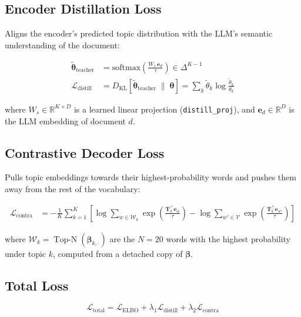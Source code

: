 \documentclass[11pt,a4paper]{article}
\begin{document}
\subsection{Encoder Distillation Loss}

Aligns the encoder's predicted topic distribution with the LLM's semantic
understanding of the document:

\begin{align}
  \tilde{\boldsymbol{\theta}}_\text{teacher}
    &= \text{softmax}\!\left(\frac{W_s\,\mathbf{e}_d}{\tau}\right) \in \Delta^{K-1}
    \label{eq:teacher}\\
  \mathcal{L}_\text{distill}
    &= D_\text{KL}\!\left[\tilde{\boldsymbol{\theta}}_\text{teacher}
                          \;\|\; \boldsymbol{\theta}\right]
     = \sum_k \tilde{\theta}_k \log\frac{\tilde{\theta}_k}{\theta_k}
    \label{eq:distill}
\end{align}

where $W_s \in \mathbb{R}^{K \times D}$ is a learned linear projection
(\texttt{distill\_proj}), and $\mathbf{e}_d \in \mathbb{R}^D$ is the LLM
embedding of document $d$.

\subsection{Contrastive Decoder Loss}

Pulls topic embeddings towards their highest-probability words and
pushes them away from the rest of the vocabulary:

\begin{align}
  \mathcal{L}_\text{contra}
  &= -\frac{1}{K}\sum_{k=1}^{K}
     \left[
       \log\sum_{w \in \mathcal{W}_k} \exp\!\left(\frac{\mathbf{T}_k^\top \mathbf{e}_w}{\tau}\right)
       - \log\sum_{w' \in \mathcal{V}} \exp\!\left(\frac{\mathbf{T}_k^\top \mathbf{e}_{w'}}{\tau}\right)
     \right]
  \label{eq:contra}
\end{align}

where $\mathcal{W}_k = \operatorname{Top-N}(\boldsymbol{\beta}_{k,\cdot})$ are the
$N=20$ words with the highest probability under topic $k$, computed from a
detached copy of $\boldsymbol{\beta}$.

\subsection{Total Loss}

\begin{equation}
  \boxed{
    \mathcal{L}_\text{total}
    = \mathcal{L}_\text{ELBO}
    + \lambda_1 \mathcal{L}_\text{distill}
    + \lambda_2 \mathcal{L}_\text{contra}
  }
  \label{eq:total}
\end{equation}
\end{document}
